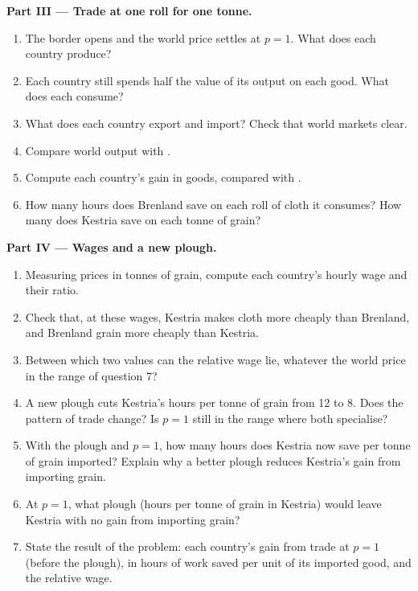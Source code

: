 \begin{problem}
\medskip
\noindent\textbf{Part III --- Trade at one roll for one tonne.}
\begin{enumerate}[resume]
\item The border opens and the world price settles at $p = 1$. What does each country produce?
\item Each country still spends half the value of its output on each good. What does each consume?
\item What does each country export and import? Check that world markets clear.
\item Compare world output with .
\item Compute each country's gain in goods, compared with .
\item How many hours does Brenland save on each roll of cloth it consumes? How many does Kestria save on each tonne of
  grain?
\end{enumerate}

\medskip
\noindent\textbf{Part IV --- Wages and a new plough.}
\begin{enumerate}[resume]
\item Measuring prices in tonnes of grain, compute each country's hourly wage and their ratio.
\item Check that, at these wages, Kestria makes cloth more cheaply than Brenland, and Brenland grain more cheaply than
  Kestria.
\item Between which two values can the relative wage lie, whatever the world price in the range of question 7?
\item A new plough cuts Kestria's hours per tonne of grain from 12 to 8. Does the pattern of trade change? Is $p = 1$
  still in the range where both specialise?
\item With the plough and $p = 1$, how many hours does Kestria now save per tonne of grain imported? Explain why a better
  plough reduces Kestria's gain from importing grain.
\item At $p = 1$, what plough (hours per tonne of grain in Kestria) would leave Kestria with no gain from
  importing grain?
\item State the result of the problem: each country's gain from trade at $p = 1$ (before the plough), in hours of work
  saved per unit of its imported good, and the relative wage.
\end{enumerate}
\end{problem}
